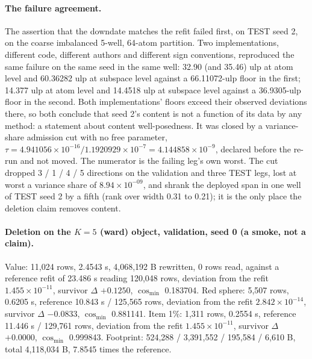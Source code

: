 \documentclass{article} %
\newcommand{\sci}[2]{\ensuremath{#1\times10^{#2}}}
\begin{document}
\paragraph{The failure agreement.} The assertion that the downdate matches the refit failed first, on TEST seed 2, on the
coarse imbalanced 5-well, 64-atom partition. Two implementations, different code, different
authors and different sign conventions, reproduced the same failure on the same seed in the same
well: 32.90 (and 35.46) ulp at atom level and 60.36282 ulp at subspace level against a 66.11072-ulp
floor in the first; 14.377 ulp at atom level and 14.4518 ulp at subspace level against a
36.9305-ulp floor in the second. Both implementations' floors exceed their observed deviations
there, so both conclude that seed 2's content is not a function of its data by any method: a
statement about content well-posedness. It was closed by a variance-share admission cut with no
free parameter, $\tau=4.941056\times10^{-16}/1.1920929\times10^{-7}=4.144858\times10^{-9}$, declared
before the re-run and not moved. The numerator is the failing leg's own worst.
The cut dropped 3 / 1 / 4 / 5 directions on the validation and three TEST legs, lost at worst a
variance share of \sci{8.94}{-09}, and shrank the deployed span in one well of TEST seed 2 by a fifth
(rank over width 0.31 to 0.21); it is the only place the deletion claim removes content.

\paragraph{Deletion on the $K=5$ (ward) object, validation, seed 0 (a smoke, not a claim).} Value:
11,024 rows, 2.4543 s, 4,068,192 B rewritten, 0 rows read, against a reference refit of 23.486 s
reading 120,048 rows, deviation from the refit \sci{1.455}{-11}, survivor $\Delta$ $+0.1250$, $\cos_{\min}$
0.183704. Red sphere: 5,507 rows, 0.6205 s, reference 10.843 s / 125,565 rows, deviation from the refit \sci{2.842}{-14}, survivor $\Delta$ $-0.0833$, $\cos_{\min}$ 0.881141. Item 1\%: 1,311 rows,
0.2554 s, reference 11.446 s / 129,761 rows, deviation from the refit \sci{1.455}{-11}, survivor $\Delta$
$+0.0000$, $\cos_{\min}$ 0.999843. Footprint: 524,288 / 3,391,552 / 195,584 / 6,610 B, total
4,118,034 B, 7.8545 times the reference. %

\end{document}
